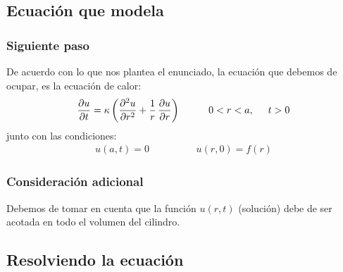 \documentclass[12pt]{beamer}
\begin{document}
\subsection{Ecuación que modela}

\begin{frame}
\frametitle{Siguiente paso}
De acuerdo con lo que nos plantea el enunciado, la ecuación que debemos de ocupar, es la ecuación de calor:
\pause
\begin{align}
\pdv{u}{t} = \kappa \left( \pdv[2]{u}{r} + \dfrac{1}{r}  \, \pdv{u}{r} \right) \hspace{1cm} 0 < r < a, \hspace{0.5cm} t > 0
\label{eq:ecuacion_CilBessel_01}
\end{align}
\pause
junto con las condiciones:
\begin{align}
u(a, t) = 0 \hspace{2cm} u(r, 0) = f(r)
\label{eq:ecuacion_CilBessel_02}
\end{align}
\end{frame}
\begin{frame}
\frametitle{Consideración adicional}
Debemos de tomar en cuenta que la función $u(r, t)$ (solución) debe de ser acotada en todo el volumen del cilindro.
\end{frame}

\subsection{Resolviendo la ecuación}
\end{document}

